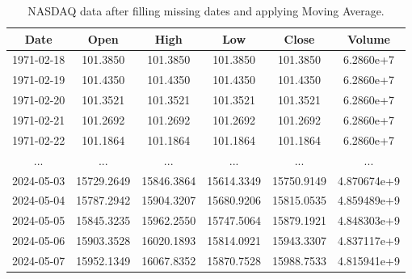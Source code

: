\begin{table}[H]
	\centering
	\caption{NASDAQ data after filling missing dates and applying Moving Average.}
	\begin{tabular}{|c|c|c|c|c|c|}
		\hline
		\textbf{Date} & \textbf{Open} & \textbf{High} & \textbf{Low} & \textbf{Close} & \textbf{Volume} \\
		\hline
		1971-02-18    & 101.3850      & 101.3850      & 101.3850     & 101.3850       & 6.2860e+7       \\
		\hline
		1971-02-19    & 101.4350      & 101.4350      & 101.4350     & 101.4350       & 6.2860e+7       \\
		\hline
		1971-02-20    & 101.3521      & 101.3521      & 101.3521     & 101.3521       & 6.2860e+7       \\
		\hline
		1971-02-21    & 101.2692      & 101.2692      & 101.2692     & 101.2692       & 6.2860e+7       \\
		\hline
		1971-02-22    & 101.1864      & 101.1864      & 101.1864     & 101.1864       & 6.2860e+7       \\
		\hline
		...           & ...           & ...           & ...          & ...            & ...             \\
		\hline
		2024-05-03    & 15729.2649    & 15846.3864    & 15614.3349   & 15750.9149     & 4.870674e+9     \\
		\hline
		2024-05-04    & 15787.2942    & 15904.3207    & 15680.9206   & 15815.0535     & 4.859489e+9     \\
		\hline
		2024-05-05    & 15845.3235    & 15962.2550    & 15747.5064   & 15879.1921     & 4.848303e+9     \\
		\hline
		2024-05-06    & 15903.3528    & 16020.1893    & 15814.0921   & 15943.3307     & 4.837117e+9     \\
		\hline
		2024-05-07    & 15952.1349    & 16067.8352    & 15870.7528   & 15988.7533     & 4.815941e+9     \\
		\hline
	\end{tabular}
	\label{tab:mva-data}
\end{table}

